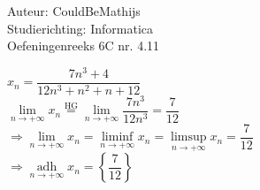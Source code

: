 \documentclass[a4paper]{article}
\newcommand{\llim}{\lim\limits}
\newcommand{\adh}{\underset{n\rightarrow+\infty}{\operatorname{adh}}}
\begin{document}
  
\noindent \large Auteur: CouldBeMathijs \\
\noindent \large Studierichting: Informatica\\
\noindent \large Oefeningenreeks 6C nr. 4.11\\

\medskip

\normalsize

$x_n = \dfrac{7n^3+4}{12n^3+n^2+n+12}$\\

$\llim_{n\rightarrow+\infty} x_n \stackrel{\text{HG}}{=} \llim_{n\rightarrow+\infty} \dfrac{7n^3}{12n^3} = \dfrac{7}{12}$\\

$\Rightarrow \llim_{n\rightarrow+\infty} x_n = \liminf\limits_{n\rightarrow+\infty} x_n = \limsup\limits_{n\rightarrow+\infty} x_n = \dfrac{7}{12}$\\

$\Rightarrow \adh x_n = \left\{\dfrac{7}{12}\right\}$


\begin{thebibliography}{999}
\end{thebibliography}
\end{document}
